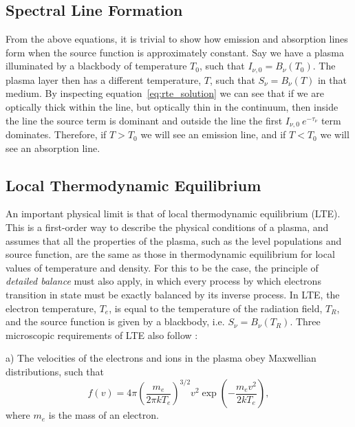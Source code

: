 


\subsection{Spectral Line Formation}

From the above equations, it is trivial to show how emission and absorption lines form when
the source function is approximately constant.
Say we have a plasma illuminated by a blackbody of temperature $T_0$, such that
$I_{\nu,0} = B_\nu (T_0)$. The plasma layer then has a different temperature, $T$,
such that $S_\nu = B_\nu (T)$ in that medium. By inspecting equation~\ref{eq:rte_solution}
we can see that if we are optically thick within the line, but optically
thin in the continuum, then inside the line the source term is dominant and outside 
the line the first $I_{\nu,0}~e^{-\tau_\nu}$ term dominates. Therefore, if $T > T_0$ we will 
see an emission line, and if $T < T_0$ we will see an absorption line. 

\subsection{Local Thermodynamic Equilibrium}
\label{sec:lte}


An important physical limit is that of local thermodynamic equilibrium (LTE).
This is a first-order way to describe the physical conditions of a plasma, and assumes
that all the properties of the plasma, such as the level populations and source function,
are the same as those in thermodynamic equilibrium for local values of 
temperature and density. For this to be the case, the principle of 
{\em detailed balance} must also apply, in which every 
process by which electrons transition in state must be exactly 
balanced by its inverse process. In LTE, the electron temperature, 
$T_e$, is equal to the temperature of the radiation field, $T_R$, and
the source function is given by a blackbody, i.e. $S_\nu = B_\nu (T_R)$.
Three microscopic requirements of LTE also follow \citep{mihalas}:

a) The velocities of the electrons and ions in the plasma obey Maxwellian
distributions, such that
\begin{equation}
f(v) = 4 \pi \left( \frac{m_e}{2 \pi kT_e} \right)^{3/2} v^2 
\exp \left( - \frac{m_ev^2}{2kT_e} \right),
\label{eq:maxwellian}
\end{equation}
where $m_e$ is the mass of an electron.

